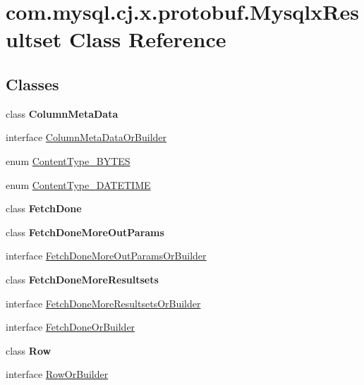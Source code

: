 \hypertarget{classcom_1_1mysql_1_1cj_1_1x_1_1protobuf_1_1_mysqlx_resultset}{}\section{com.\+mysql.\+cj.\+x.\+protobuf.\+Mysqlx\+Resultset Class Reference}
\label{classcom_1_1mysql_1_1cj_1_1x_1_1protobuf_1_1_mysqlx_resultset}
\subsection*{Classes}
\begin{DoxyCompactItemize}
\item 
class {\bfseries Column\+Meta\+Data}
\item 
interface \mbox{\hyperlink{interfacecom_1_1mysql_1_1cj_1_1x_1_1protobuf_1_1_mysqlx_resultset_1_1_column_meta_data_or_builder}{Column\+Meta\+Data\+Or\+Builder}}
\item 
enum \mbox{\hyperlink{enumcom_1_1mysql_1_1cj_1_1x_1_1protobuf_1_1_mysqlx_resultset_1_1_content_type___b_y_t_e_s}{Content\+Type\+\_\+\+B\+Y\+T\+ES}}
\item 
enum \mbox{\hyperlink{enumcom_1_1mysql_1_1cj_1_1x_1_1protobuf_1_1_mysqlx_resultset_1_1_content_type___d_a_t_e_t_i_m_e}{Content\+Type\+\_\+\+D\+A\+T\+E\+T\+I\+ME}}
\item 
class {\bfseries Fetch\+Done}
\item 
class {\bfseries Fetch\+Done\+More\+Out\+Params}
\item 
interface \mbox{\hyperlink{interfacecom_1_1mysql_1_1cj_1_1x_1_1protobuf_1_1_mysqlx_resultset_1_1_fetch_done_more_out_params_or_builder}{Fetch\+Done\+More\+Out\+Params\+Or\+Builder}}
\item 
class {\bfseries Fetch\+Done\+More\+Resultsets}
\item 
interface \mbox{\hyperlink{interfacecom_1_1mysql_1_1cj_1_1x_1_1protobuf_1_1_mysqlx_resultset_1_1_fetch_done_more_resultsets_or_builder}{Fetch\+Done\+More\+Resultsets\+Or\+Builder}}
\item 
interface \mbox{\hyperlink{interfacecom_1_1mysql_1_1cj_1_1x_1_1protobuf_1_1_mysqlx_resultset_1_1_fetch_done_or_builder}{Fetch\+Done\+Or\+Builder}}
\item 
class {\bfseries Row}
\item 
interface \mbox{\hyperlink{interfacecom_1_1mysql_1_1cj_1_1x_1_1protobuf_1_1_mysqlx_resultset_1_1_row_or_builder}{Row\+Or\+Builder}}
\end{DoxyCompactItemize}
